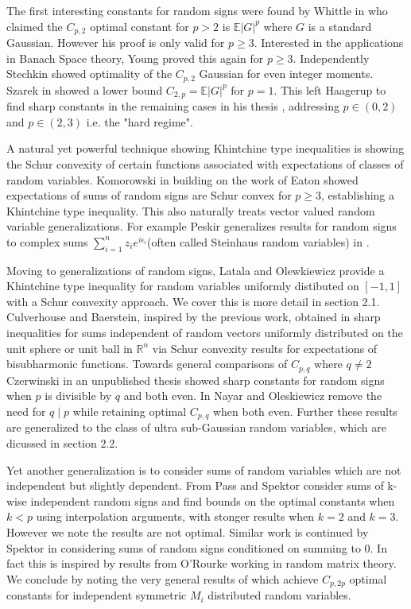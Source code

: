 \documentclass[10pt]{article}
\newcommand{\E}{\mathbb{E}}
\newcommand{\1}{\textbf{1}}
\newcommand{\R}{\mathbb{R}}
\newcommand{\normOne}[1]{\left\lvert#1\right\rvert}
\theoremstyle{remark}
\theoremstyle{definition}
\begin{document}
The first interesting constants for random signs were found by Whittle in \cite{W} who claimed the $C_{p,2}$ optimal constant for $p > 2$ is $\E\normOne{G}^p$ where $G$ is a standard Gaussian. However his proof is only valid for $p \geq 3$. Interested in the applications in Banach Space theory, Young \cite{Y} proved this again for $p \geq 3$. Independently Stechkin \cite{SBS} showed optimality of the $C_{p,2}$ Gaussian for even integer moments. Szarek in \cite{S} showed a lower bound $C_{2,p} = \E\normOne{G}^p$ for $p=1$. This left Haagerup to find sharp constants in the remaining cases in his thesis \cite{H}, addressing $p \in (0,2)$ and $p\in (2,3)$ i.e. the "hard regime". 

A natural yet powerful technique showing Khintchine type inequalities is showing the Schur convexity of certain functions associated with expectations of classes of random variables. Komorowski in \cite{K} building on the work of Eaton \cite{E} showed expectations of sums of random signs are Schur convex for $p\geq 3$, establishing a Khintchine type inequality. This also naturally treats vector valued random variable generalizations. For example Peskir generalizes results for random signs to complex sums $\sum_{i=1}^n z_ie^{i\epsilon_i}$(often called Steinhaus random variables) in \cite{P}. 

Moving to generalizations of random signs, Latala and Olewkiewicz provide a Khintchine type inequality for random variables uniformly distibuted on $[-1,1]$ with a Schur convexity approach. We cover this is more detail in section 2.1. Culverhouse and Baerstein, inspired by the previous work, obtained in \cite{BC} sharp inequalities for sums independent of random vectors uniformly distributed on the unit sphere or unit ball in $\R^n$ via Schur convexity results for expectations of bisubharmonic functions. Towards general comparisons of $C_{p,q}$ where $q \neq 2$ Czerwinski in an unpublished thesis showed sharp constants for random signs when $p$ is divisible by $q$ and both even. In \cite{NO} Nayar and Oleskiewicz remove the need for $q \mid p$ while retaining optimal $C_{p,q}$ when both even. Further these results are generalized to the class of ultra sub-Gaussian random variables, which are dicussed in section 2.2.

Yet another generalization is to consider sums of random variables which are not independent but slightly dependent. From \cite{SP} Pass and Spektor consider sums of k-wise independent random signs and find bounds on the optimal constants when $k < p$ using interpolation arguments, with stonger results when $k=2$ and $k=3$. However we note the results are not optimal. Similar work is continued by Spektor in \cite{SS} considering sums of random signs conditioned on summing to 0. In fact this is inspired by results from O'Rourke \cite{SOR} working in random matrix theory. We conclude by noting the very general results of \cite{KLO} which achieve $C_{p,2p}$ optimal constants for independent symmetric $M_i$ distributed random variables. 
\end{document}
